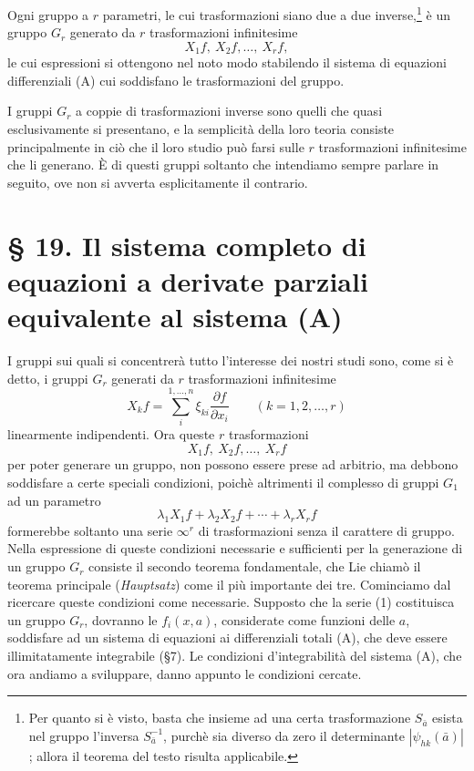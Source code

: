 \documentclass[11pt]{book}
\begin{document}
Ogni gruppo a $r$ parametri, le cui trasformazioni siano due a due inverse,\footnote{Per quanto si è visto, basta che insieme ad una certa trasformazione $S_{\bar a}$ esista nel gruppo l'inversa $S_{\bar a}^{-1}$, purchè sia diverso da zero il determinante $|\psi_{hk}(\bar a)|$; allora il teorema del testo risulta applicabile.} è un gruppo $G_r$ generato da $r$ trasformazioni infinitesime
\[
 X_1f,\ X_2f,\ldots,\ X_rf,
\]
le cui espressioni si ottengono nel noto modo stabilendo il sistema di equazioni differenziali (A) cui soddisfano le trasformazioni del gruppo.

I gruppi $G_r$ a coppie di trasformazioni inverse sono quelli che quasi esclusivamente si presentano, e la semplicità della loro teoria consiste principalmente in ciò che il loro studio può farsi sulle $r$ trasformazioni infinitesime che li generano. È di questi gruppi soltanto che intendiamo sempre parlare in seguito, ove non si avverta esplicitamente il contrario.

\section*{\S{} 19. Il sistema completo di equazioni a derivate parziali equivalente al sistema (A)}

I gruppi sui quali si concentrerà tutto l'interesse dei nostri studi sono, come si è detto, i gruppi $G_r$ generati da $r$ trasformazioni infinitesime
\[
 X_kf=\sum\limits_i^{1,\ldots,n}\xi_{ki}\frac{\partial f}{\partial x_i}\qquad (k=1,2,\ldots,r)
\]
linearmente indipendenti. Ora queste $r$ trasformazioni
\[
 X_1f,\ X_2f,\ldots,\ X_rf
\]
per poter generare un gruppo, non possono essere prese ad arbitrio, ma debbono soddisfare a certe speciali condizioni, poichè altrimenti il complesso di gruppi $G_1$ ad un parametro
\[
 \lambda_1X_1f+\lambda_2X_2f+\cdots+\lambda_rX_rf
\]
formerebbe soltanto una serie $\infty^r$ di trasformazioni senza il carattere di gruppo. Nella espressione di queste condizioni necessarie e sufficienti per la generazione di un gruppo $G_r$ consiste il secondo teorema fondamentale, che Lie chiamò il teorema principale (\emph{Hauptsatz}) come il più importante dei tre. Cominciamo dal ricercare queste condizioni come necessarie. Supposto che la serie (1) costituisca un gruppo $G_r$, dovranno le $f_i(x,a)$, considerate come funzioni delle $a$, soddisfare ad un sistema di equazioni ai differenziali totali (A), che deve essere illimitatamente integrabile (\S{}7). Le condizioni d'integrabilità del sistema (A), che ora andiamo a sviluppare, danno appunto le condizioni cercate.
\end{document}
